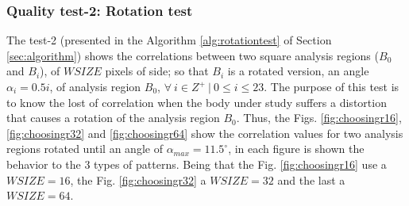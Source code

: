 
\subsubsection{Quality test-2: Rotation test}
The test-2 (presented in the Algorithm \ref{alg:rotationtest} of Section \ref{sec:algorithm}) 
shows the correlations between two square analysis regions 
($B_0$ and $B_i$),
of $WSIZE$ pixels of side; so that $B_i$ is a rotated version, an angle $\alpha_i=0.5 i$, 
of analysis region $B_0$, $\forall~i\in Z^+~|~0  \leq  i \leq 23$. 
The purpose of this test is to know the lost of correlation when the body under study
suffers a distortion  that causes a rotation of the analysis region $B_0$.
Thus, the Figs. \ref{fig:choosingr16}, \ref{fig:choosingr32} and \ref{fig:choosingr64}
show the correlation values for two analysis regions rotated until an angle of $\alpha_{max}=11.5^\circ$,
in each figure is shown the behavior to the 3 types of patterns. Being that the Fig. \ref{fig:choosingr16}
use a $WSIZE=16$, the Fig. \ref{fig:choosingr32} a $WSIZE=32$ and the last a $WSIZE=64$.
